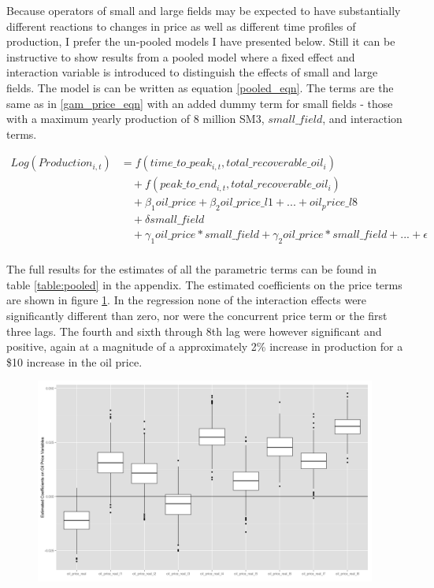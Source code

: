 \documentclass[12pt]{article}
\begin{document}
Because operators of small and large fields may be expected to have substantially different reactions to changes in price as well as different time profiles of production, I prefer the un-pooled models I have presented below. Still it can be instructive to show results from a pooled model where a fixed effect and interaction variable is introduced to distinguish the effects of small and large fields. The model is can be written as equation \ref{pooled_eqn}.  The terms are the same as in \ref{gam_price_eqn} with an added dummy term for small fields - those with a maximum yearly production of 8 million SM3, $small\_field$, and interaction terms.  

\begin{equation}
\begin{split}
	Log(Production_{i,t})&=f(time\_to\_peak_{i,t}, total\_recoverable\_oil_i) \\
	& \quad + f(peak\_to\_end_{i,t}, total\_recoverable\_oil_i) \\
	& \quad + \beta_1 oil\_price + \beta_2 oil\_price\_l1 + ... + oil_price\_l8\\
	& \quad + \delta small\_field \\
	& \quad + \gamma_1 oil\_price*small\_field + \gamma_2 oil\_price*small\_field + ...
	+  \epsilon \\
\end{split}
\label{pooled_eqn}
\end{equation}

The full results for the estimates of all the parametric terms can be found in table \ref{table:pooled} in the appendix.  The estimated coefficients on the price terms are shown in figure \ref{gam_price_pooled}. In the regression none of the interaction effects were significantly different than zero, nor were the concurrent price term or the first three lags.  The fourth and sixth through 8th lag were however significant and positive, again at a magnitude of a approximately 2\% increase in production for a \$10 increase in the oil price.

\begin{figure}
	\includegraphics[width=1\textwidth]{figures/gam_price_pooled_print.png}
	\caption{}
	\label{gam_price_pooled}
\end{figure}
\end{document}
